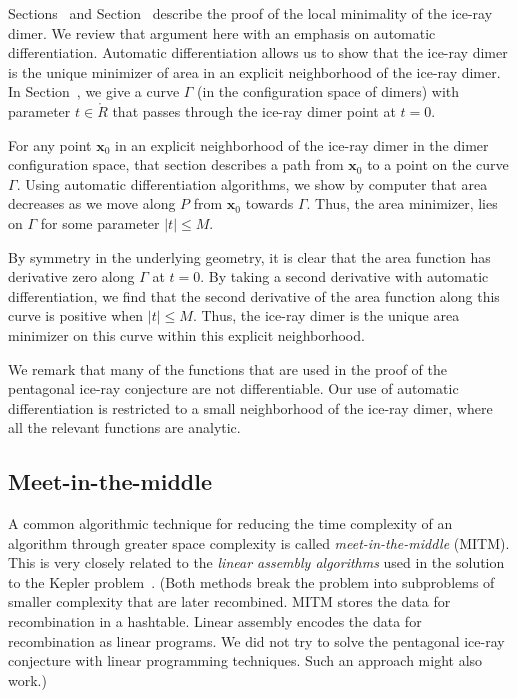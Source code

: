 Sections~ and Section~ describe
the proof of the local minimality of the ice-ray dimer.  We review
that argument here with an emphasis on automatic differentiation.
Automatic differentiation allows us to show that the ice-ray dimer is
the unique minimizer of area in an explicit neighborhood of the
ice-ray dimer.  In Section~, we give a curve
$\Gamma$ (in the configuration space of dimers) with parameter
$t\in\ring{R}$ that passes through the ice-ray dimer point at $t=0$.

For any point $\mathbf{x}_0$ in an explicit neighborhood of the ice-ray dimer
in the dimer configuration space, that section describes a path from
$\mathbf{x}_0$ to a point on the curve $\Gamma$.  Using automatic
differentiation algorithms, we show by computer that area decreases as
we move along $P$ from $\mathbf{x}_0$ towards $\Gamma$.  Thus, the area
minimizer, lies on $\Gamma$ for some parameter $|t|\le M$.

By symmetry in the underlying geometry, it is clear that the area
function has derivative zero along $\Gamma$ at $t=0$. By taking a
second derivative with automatic differentiation, we find that the
second derivative of the area function along this curve is positive
when $|t|\le M$.  Thus, the ice-ray dimer is the unique area minimizer
on this curve within this explicit neighborhood.

We remark that many of the functions that are used in the proof of the
pentagonal ice-ray conjecture are not differentiable.  Our use of
automatic differentiation is restricted to a small neighborhood of the
ice-ray dimer, where all the relevant functions are analytic.

\subsection{Meet-in-the-middle}

A common algorithmic technique for reducing the time complexity of an
algorithm through greater space complexity is called {\it
  meet-in-the-middle} (MITM).  This is very closely related to the
{\it linear assembly algorithms} used in the solution to the Kepler
problem~\cite{hales2003some}. (Both methods break the problem into
subproblems of smaller complexity that are later recombined.  MITM
stores the data for recombination in a hashtable.  Linear assembly
encodes the data for recombination as linear programs.  We did not
try to solve the pentagonal ice-ray conjecture with linear programming
techniques. Such an approach might also work.)

